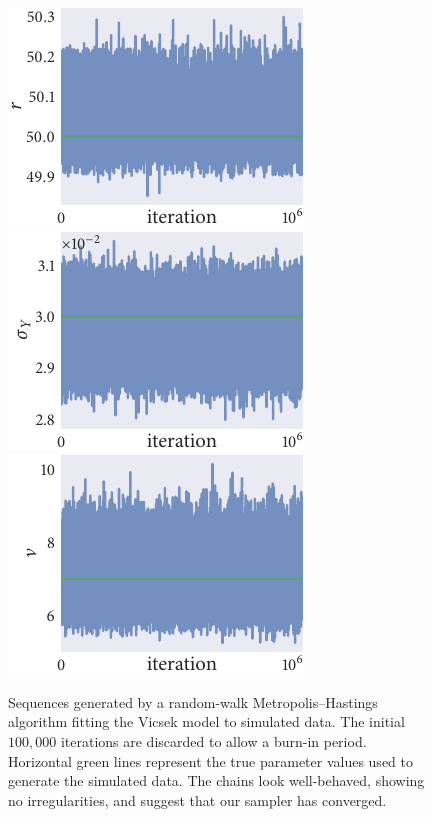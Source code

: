 \begin{figure}[p]
  \includegraphics{r_trace_r.pdf}%
  \includegraphics{r_trace_sigma_Y.pdf}%
  \includegraphics{r_trace_nu.pdf}
  \caption{Sequences generated by a random-walk Metropolis--Hastings algorithm
    fitting the Vicsek model to simulated data. The initial $100,000$
    iterations are discarded to allow a burn-in period. Horizontal green
    lines represent the true parameter values used to generate the simulated
    data. The chains look well-behaved, showing no irregularities, and suggest
    that our sampler has converged.}
  \label{fig:vicsek_trace}
\end{figure}%
